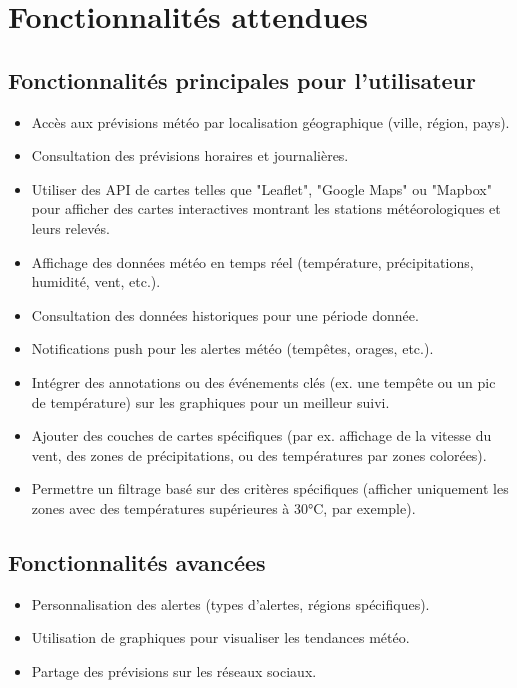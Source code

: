\documentclass[a4paper,12pt]{article}
\begin{document}
\section{Fonctionnalités attendues}
\subsection{Fonctionnalités principales pour l'utilisateur}
\begin{itemize}
    \item Accès aux prévisions météo par localisation géographique (ville, région, pays).
    \item Consultation des prévisions horaires et journalières.
    \item Utiliser des API de cartes telles que "Leaflet", "Google Maps" ou "Mapbox" pour afficher des cartes interactives montrant les stations météorologiques et leurs relevés.
    \item Affichage des données météo en temps réel (température, précipitations, humidité, vent, etc.).
    \item Consultation des données historiques pour une période donnée.
    \item Notifications push pour les alertes météo (tempêtes, orages, etc.).
     \item Intégrer des annotations ou des événements clés (ex. une tempête ou un pic de température) sur les graphiques pour un meilleur suivi.
\item Ajouter des couches de cartes spécifiques (par ex. affichage de la vitesse du vent, des zones de précipitations, ou des températures par zones colorées).
\item Permettre un filtrage basé sur des critères spécifiques (afficher uniquement les zones avec des températures supérieures à 30°C, par exemple).

\end{itemize}

\subsection{Fonctionnalités avancées}
\begin{itemize}
    \item Personnalisation des alertes (types d’alertes, régions spécifiques).
    \item Utilisation de graphiques pour visualiser les tendances météo.
    \item Partage des prévisions sur les réseaux sociaux.
 

\end{itemize}
\end{document}
